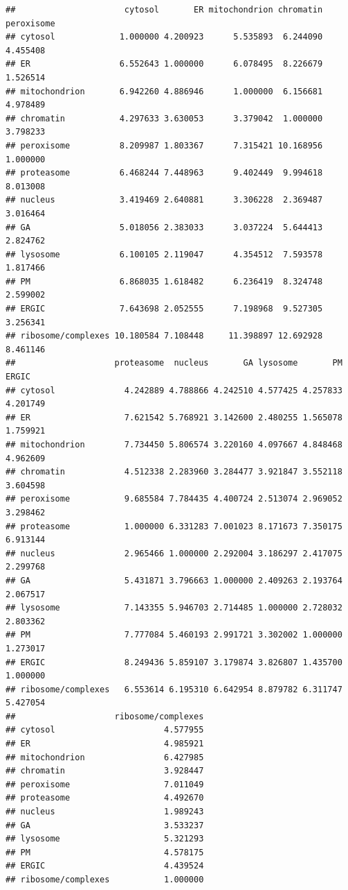 \documentclass[9pt,a4paper,]{extarticle}
\begin{document}
\begin{verbatim}
##                      cytosol       ER mitochondrion chromatin peroxisome
## cytosol             1.000000 4.200923      5.535893  6.244090   4.455408
## ER                  6.552643 1.000000      6.078495  8.226679   1.526514
## mitochondrion       6.942260 4.886946      1.000000  6.156681   4.978489
## chromatin           4.297633 3.630053      3.379042  1.000000   3.798233
## peroxisome          8.209987 1.803367      7.315421 10.168956   1.000000
## proteasome          6.468244 7.448963      9.402449  9.994618   8.013008
## nucleus             3.419469 2.640881      3.306228  2.369487   3.016464
## GA                  5.018056 2.383033      3.037224  5.644413   2.824762
## lysosome            6.100105 2.119047      4.354512  7.593578   1.817466
## PM                  6.868035 1.618482      6.236419  8.324748   2.599002
## ERGIC               7.643698 2.052555      7.198968  9.527305   3.256341
## ribosome/complexes 10.180584 7.108448     11.398897 12.692928   8.461146
##                    proteasome  nucleus       GA lysosome       PM    ERGIC
## cytosol              4.242889 4.788866 4.242510 4.577425 4.257833 4.201749
## ER                   7.621542 5.768921 3.142600 2.480255 1.565078 1.759921
## mitochondrion        7.734450 5.806574 3.220160 4.097667 4.848468 4.962609
## chromatin            4.512338 2.283960 3.284477 3.921847 3.552118 3.604598
## peroxisome           9.685584 7.784435 4.400724 2.513074 2.969052 3.298462
## proteasome           1.000000 6.331283 7.001023 8.171673 7.350175 6.913144
## nucleus              2.965466 1.000000 2.292004 3.186297 2.417075 2.299768
## GA                   5.431871 3.796663 1.000000 2.409263 2.193764 2.067517
## lysosome             7.143355 5.946703 2.714485 1.000000 2.728032 2.803362
## PM                   7.777084 5.460193 2.991721 3.302002 1.000000 1.273017
## ERGIC                8.249436 5.859107 3.179874 3.826807 1.435700 1.000000
## ribosome/complexes   6.553614 6.195310 6.642954 8.879782 6.311747 5.427054
##                    ribosome/complexes
## cytosol                      4.577955
## ER                           4.985921
## mitochondrion                6.427985
## chromatin                    3.928447
## peroxisome                   7.011049
## proteasome                   4.492670
## nucleus                      1.989243
## GA                           3.533237
## lysosome                     5.321293
## PM                           4.578175
## ERGIC                        4.439524
## ribosome/complexes           1.000000
\end{verbatim}
\end{document}
